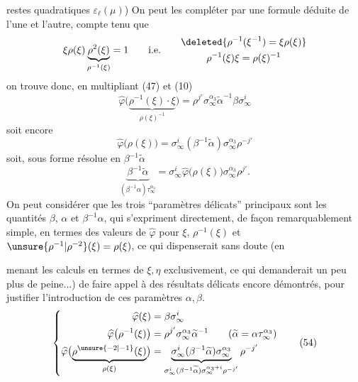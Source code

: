 restes quadratiques $\varepsilon_\ell(\mu)$) On peut les compléter par une formule déduite de l'une et  l'autre, compte tenu que
\[
\xi\rho(\xi)\underbrace{\rho^2(\xi)}_{\rho^{-1}(\xi)}=1
\qquad\text{i.e.}\qquad
\begin{gathered}
\deleted{\rho^{-1}(\xi^{-1})=\xi\rho(\xi)}\\
\rho^{-1}(\xi)\xi=\rho(\xi)^{-1}
\end{gathered}
\]
on trouve donc, en multipliant (47) et (10)
\[
\widehat{\varphi}\bigl(\underbrace{\rho^{-1}(\xi)\cdot\xi}_{\rho(\xi)^{-1}}\bigr)
=\rho^{j'}\sigma_\infty^{\alpha_3}\widetilde\alpha^{-1}\beta\sigma_\infty^i
\]
soit encore
\[
\widehat{\varphi}\bigl(\rho(\xi)\bigr)
=\sigma_\infty^i(\beta^{-1}\widetilde\alpha)\sigma_\infty^{\alpha_3}\rho^{-j'}
\tag{52}
\]
soit, sous forme résolue en $\beta^{-1}\widetilde\alpha$
\[
\underbrace{\beta^{-1}\widetilde\alpha}_{(\beta^{-1}\alpha)\tau_\infty^{\alpha_3}}
=\sigma_\infty^i\widehat{\varphi}\bigl(\rho(\xi)\bigr)\sigma_\infty^{\alpha_3}\rho^{j'}.
\tag{53}
\]
On peut considérer que les trois ``paramètres délicats'' principaux sont les quantités $\beta$, $\alpha$ et $\beta^{-1}\alpha$, qui s'expriment directement, de façon remarquablement simple, en termes des valeurs de $\widehat{\varphi}$ pour $\xi$, $\rho^{-1}(\xi)$ et $\unsure{\rho^{-1}|\rho^{-2}}(\xi)=\rho(\xi)$, ce qui dispenserait  sans doute (en


menant les calculs en termes de $\xi,\eta$ exclusivement, ce qui demanderait un peu plus de peine...) de faire appel à des résultats délicats  encore démontrés,  pour justifier l'introduction de ces paramètres $\alpha,\beta$.
\[
\left\{
\begin{aligned}
\widehat{\varphi}(\xi)&=\beta\sigma_\infty^i\\
\widehat{\varphi}\bigl(\rho^{-1}(\xi)\bigr)&=\rho^{j'}\sigma_\infty^{\alpha_3}\widetilde\alpha^{-1}
\qquad(\widetilde\alpha=\alpha\tau_\infty^{\alpha_3})\\
\widehat{\varphi}\bigl(\underbrace{\rho^{\unsure{-2|-1}}(\xi)}_{\rho(\xi)}\bigr)
&=\underbrace{\sigma_\infty^i(\beta^{-1}\widetilde\alpha)\sigma_\infty^{\alpha_3}}_{\sigma_\infty^i(\beta^{-1}\widetilde\alpha)\sigma_\infty^{\alpha_3+i}\rho^{-j'}}\rho^{-j'}
\end{aligned}
\right.
\tag{54}
\]

